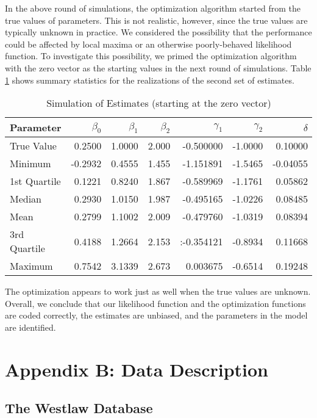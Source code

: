 \documentclass[11pt]{paper}
\begin{document}
In the above round of simulations, 
the optimization algorithm started from the true values of parameters.
This is not realistic, however, 
since the true values are typically unknown in practice.  
We considered the possibility that the performance could be affected by
local maxima or an otherwise poorly-behaved likelihood function. 
To investigate this possibility, we primed the optimization algorithm 
with the zero vector as the starting values
in the next round of simulations.
Table \ref{tab:sim_cold} shows summary statistics for the realizations of the
second set of estimates. 
% 
\begin{table}[ht]
\centering
\begin{tabular}{l r r r r r r}
  \hline
	Parameter 	& $\beta_0$	& $\beta_1$	& $\beta_2$	& $\gamma_1$	& $\gamma_2$	& $\delta$ \\ 
  \hline
	True Value 	&  0.2500 		&   1.0000 	&   2.000 		&  -0.500000		&   -1.0000 		&   0.10000  \\
  \hline
 	Minimum		&  -0.2932 	&   0.4555 	&   1.455 		&   -1.151891 		&   -1.5465  		&  -0.04055  \\
 	1st Quartile	&   0.1221 	&   0.8240 	&   1.867 		&   -0.589969 		&   -1.1761  		&   0.05862  \\
 	Median 		&   0.2930 	&   1.0150 	&   1.987 		&   -0.495165 		&   -1.0226  		&   0.08485  \\
 	Mean   		&   0.2799 	&   1.1002 	&   2.009 		&   -0.479760 		&   -1.0319  		&   0.08394  \\
 	3rd Quartile	&   0.4188 	&   1.2664 	&   2.153 		&   :-0.354121 	&   -0.8934  		&   0.11668  \\
 	Maximum   	&   0.7542 	&   3.1339 	&   2.673 		&    0.003675 		&   -0.6514  		&   0.19248  \\
   \hline
\end{tabular}
\caption{Simulation of Estimates (starting at the zero vector)} 
\label{tab:sim_cold}
\end{table}
% 
The optimization appears to work just as well when the true values are unknown. 
Overall, we conclude that our likelihood function 
and the optimization functions are coded correctly, 
the estimates are unbiased, 
and the parameters in the model are identified. 


\section*{Appendix B: Data Description}


\subsection*{The Westlaw Database}
\end{document}
